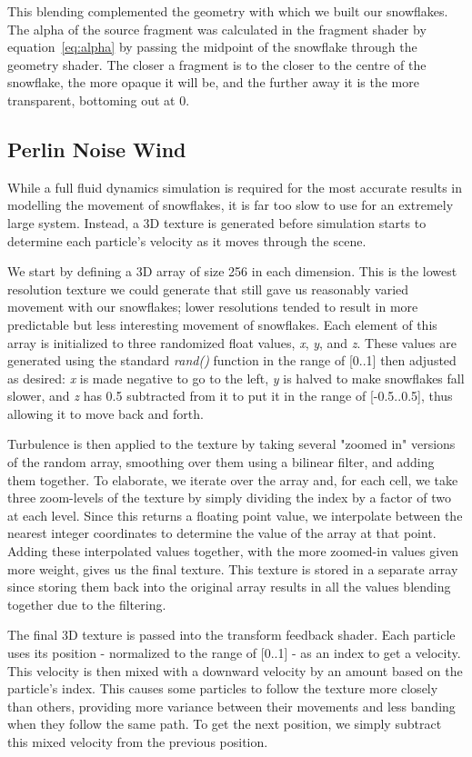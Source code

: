 \documentclass[conference]{acmsiggraph}
\begin{document}
This blending complemented the geometry with which we built our snowflakes. The alpha of the source fragment was calculated in the fragment shader by equation~\ref{eq:alpha} by passing the midpoint of the snowflake through the geometry shader. The closer a fragment is to the closer to the centre of the snowflake, the more opaque it will be, and the further away it is the more transparent, bottoming out at 0.

\subsection{Perlin Noise Wind}
While a full fluid dynamics simulation is required for the most accurate results in modelling the movement of snowflakes, it is far too slow to use for an extremely large system. Instead, a 3D texture is generated before simulation starts to determine each particle's velocity as it moves through the scene.

We start by defining a 3D array of size 256 in each dimension. This is the lowest resolution texture we could generate that still gave us reasonably varied movement with our snowflakes; lower resolutions tended to result in more predictable but less interesting movement of snowflakes. Each element of this array is initialized to three randomized float values, \textit{x}, \textit{y}, and \textit{z}. These values are generated using the standard \textit{rand()} function in the range of [0..1] then adjusted as desired: \textit{x} is made negative to go to the left, \textit{y} is halved to make snowflakes fall slower, and \textit{z} has 0.5 subtracted from it to put it in the range of [-0.5..0.5], thus allowing it to move back and forth.

Turbulence is then applied to the texture by taking several "zoomed in" versions of the random array, smoothing over them using a bilinear filter, and adding them together. To elaborate, we iterate over the array and, for each cell, we take three zoom-levels of the texture by simply dividing the index by a factor of two at each level. Since this returns a floating point value, we interpolate between the nearest integer coordinates to determine the value of the array at that point. Adding these interpolated values together, with the more zoomed-in values given more weight, gives us the final texture. This texture is stored in a separate array since storing them back into the original array results in all the values blending together due to the filtering.

The final 3D texture is passed into the transform feedback shader. Each particle uses its position - normalized to the range of [0..1] -  as an index to get a velocity. This velocity is then mixed with a downward velocity by an amount based on the particle's index. This causes some particles to follow the texture more closely than others, providing more variance between their movements and less banding when they follow the same path. To get the next position, we simply subtract this mixed velocity from the previous position.
\end{document}

